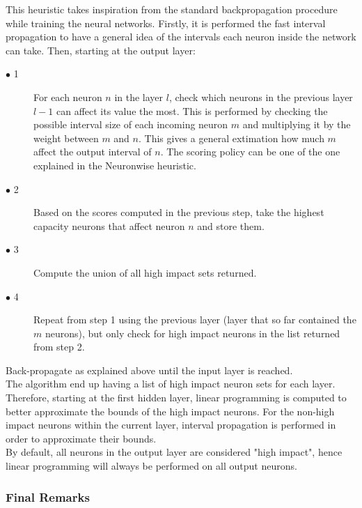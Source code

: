 \documentclass[11pt,a4paper]{article}
\begin{document}
This heuristic takes inspiration from the standard backpropagation procedure while training the neural networks.
Firstly, it is performed the fast interval propagation to have a general idea of the intervals each neuron inside the network can take. Then, starting at the output layer:
\begin{description}
  \item[$\bullet$ 1]  For each neuron $n$ in the layer $l$, check which neurons in the previous layer $l-1$ can affect its value the most. This is performed by checking the possible interval size of each incoming neuron $m$ and multiplying it by the weight between $m$ and $n$. This gives a general extimation how much $m$ affect the output interval of $n$. The scoring policy can be one of the one explained in the Neuronwise heuristic.
  \item[$\bullet$ 2]  Based on the scores computed in the previous step, take the highest capacity neurons that affect neuron $n$ and store them.
  \item[$\bullet$ 3]  Compute the union of all high impact sets returned.
  \item[$\bullet$ 4]  Repeat from step 1 using the previous layer (layer that so far contained the $m$ neurons), but only check for high impact neurons in the list returned from step 2.  
\end{description}
Back-propagate as explained above until the input layer is reached.\\ The algorithm end up having a list of high impact neuron sets for each layer.
Therefore, starting at the first hidden layer, linear programming is computed to better approximate the bounds of the high impact neurons. For the non-high impact neurons within the current layer,  interval propagation is performed in order to approximate their bounds.\\By default, all neurons in the output layer are considered "high impact", hence linear programming will always be performed on all output neurons.

\subsubsection{Final Remarks}
\end{document}

